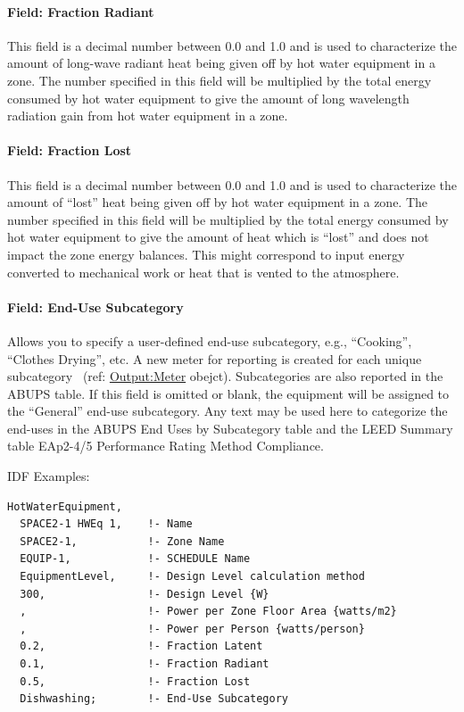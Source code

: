 \paragraph{Field: Fraction Radiant}\label{field-fraction-radiant-4}

This field is a decimal number between 0.0 and 1.0 and is used to characterize the amount of long-wave radiant heat being given off by hot water equipment in a zone. The number specified in this field will be multiplied by the total energy consumed by hot water equipment to give the amount of long wavelength radiation gain from hot water equipment in a zone.

\paragraph{Field: Fraction Lost}\label{field-fraction-lost-2}

This field is a decimal number between 0.0 and 1.0 and is used to characterize the amount of ``lost'' heat being given off by hot water equipment in a zone. The number specified in this field will be multiplied by the total energy consumed by hot water equipment to give the amount of heat which is ``lost'' and does not impact the zone energy balances. This might correspond to input energy converted to mechanical work or heat that is vented to the atmosphere.

\paragraph{Field: End-Use Subcategory}\label{field-end-use-subcategory-3-000}

Allows you to specify a user-defined end-use subcategory, e.g., ``Cooking'', ``Clothes Drying'', etc. A new meter for reporting is created for each unique subcategory~ (ref: \hyperref[outputmeter-and-outputmetermeterfileonly]{Output:Meter} obejct). Subcategories are also reported in the ABUPS table. If this field is omitted or blank, the equipment will be assigned to the ``General'' end-use subcategory. Any text may be used here to categorize the end-uses in the ABUPS End Uses by Subcategory table and the LEED Summary table EAp2-4/5 Performance Rating Method Compliance.

IDF Examples:

\begin{lstlisting}
HotWaterEquipment,
  SPACE2-1 HWEq 1,    !- Name
  SPACE2-1,           !- Zone Name
  EQUIP-1,            !- SCHEDULE Name
  EquipmentLevel,     !- Design Level calculation method
  300,                !- Design Level {W}
  ,                   !- Power per Zone Floor Area {watts/m2}
  ,                   !- Power per Person {watts/person}
  0.2,                !- Fraction Latent
  0.1,                !- Fraction Radiant
  0.5,                !- Fraction Lost
  Dishwashing;        !- End-Use Subcategory
\end{lstlisting}

